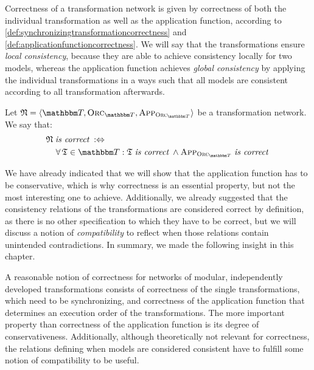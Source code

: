 Correctness of a transformation network is given by correctness of both the individual transformation as well as the application function, according to \autoref{def:synchronizingtransformationcorrectness} and \autoref{def:applicationfunctioncorrectness}.
We will say that the transformations ensure \emph{local consistency}, because they are able to achieve consistency locally for two models, whereas the application function achieves \emph{global consistency} by applying the individual transformations in a ways such that all models are consistent according to all transformation afterwards.

\begin{definition}
    \label{def:transformationnetworkcorrectness}
    Let $\transformationnetwork{N} = \tupled{\transformationset{T}, \orcfunction{\transformationset{T}}, \appfunction{\orcfunction{\transformationset{T}}}}$ be a transformation network.
    We say that:
    \begin{align*}
        & 
        \transformationnetwork{N} \mathtext{is correct} \equivalentperdefinition \\
        & \formulaskip
        \forall \transformation{T} \in \transformationset{T} : \transformation{T} \mathtext{is correct} \land \appfunction{\orcfunction{\transformationset{T}}} \mathtext{is correct}
    \end{align*}
\end{definition}

We have already indicated that we will show that the application function has to be conservative, which is why correctness is an essential property, but not the most interesting one to achieve.
Additionally, we already suggested that the consistency relations of the transformations are considered correct by definition, as there is no other specification to which they have to be correct, but we will discuss a notion of \emph{compatibility} to reflect when those relations contain unintended contradictions.
In summary, we made the following insight in this chapter.

\begin{insight}
    A reasonable notion of correctness for networks of modular, independently developed transformations consists of correctness of the single transformations, which need to be synchronizing, and correctness of the application function that determines an execution order of the transformations.
    The more important property than correctness of the application function is its degree of conservativeness.
    Additionally, although theoretically not relevant for correctness, the relations defining when models are considered consistent have to fulfill some notion of compatibility to be useful.
\end{insight}

